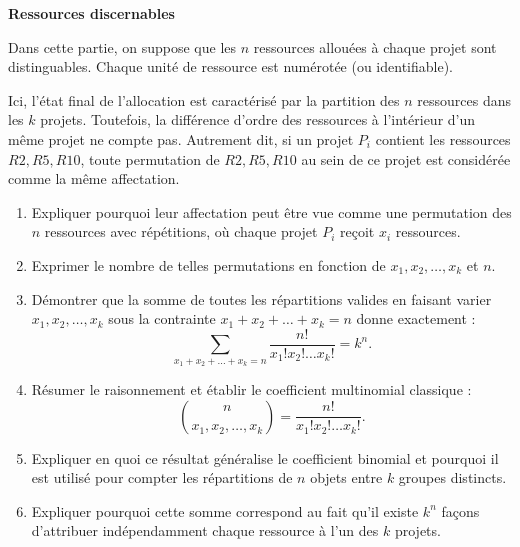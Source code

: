 \documentclass[10pt,a4paper]{article}
\begin{document}
\q \textbf{Ressources discernables}

Dans cette partie, on suppose que les $n$ ressources allouées à chaque projet sont distinguables.
Chaque unité de ressource est numérotée (ou identifiable).

Ici, l'état final de l'allocation est caractérisé par la partition des $n$ ressources dans les $k$
projets. Toutefois, la différence d'ordre des ressources à l'intérieur d'un même projet ne compte
pas. Autrement dit, si un projet $P_i$ contient les ressources $R2,R5,R10$, toute permutation de
$R2,R5,R10$ au sein de ce projet est considérée comme la même affectation.

\begin{enumerate}
   \item Expliquer pourquoi leur affectation peut être vue comme une permutation des \( n \)
   ressources avec répétitions, où chaque projet \( P_i \) reçoit \( x_i \) ressources.
   \item Exprimer le nombre de telles permutations en fonction de \( x_1, x_2, \dots, x_k \) et $n$.
   \item Démontrer que la somme de toutes les répartitions valides en faisant varier \( x_1, x_2,
   \dots, x_k \) sous la contrainte \( x_1 + x_2 + \dots + x_k = n \) donne exactement :
   \[
   \sum_{x_1 + x_2 + \dots + x_k = n} \frac{n!}{x_1! x_2! \dots x_k!} = k^n.
   \]
   \item Résumer le raisonnement et établir le coefficient multinomial classique :
   \[
   \binom{n}{x_1, x_2, \dots, x_k} = \frac{n!}{x_1! x_2! \dots x_k!}.
   \]
   \item Expliquer en quoi ce résultat généralise le coefficient binomial et pourquoi il est utilisé
   pour compter les répartitions de \( n \) objets entre \( k \) groupes distincts.
   \item Expliquer pourquoi cette somme correspond au fait qu'il existe \( k^n \) façons d'attribuer
   indépendamment chaque ressource à l'un des \( k \) projets.
\end{enumerate}
\end{document}
